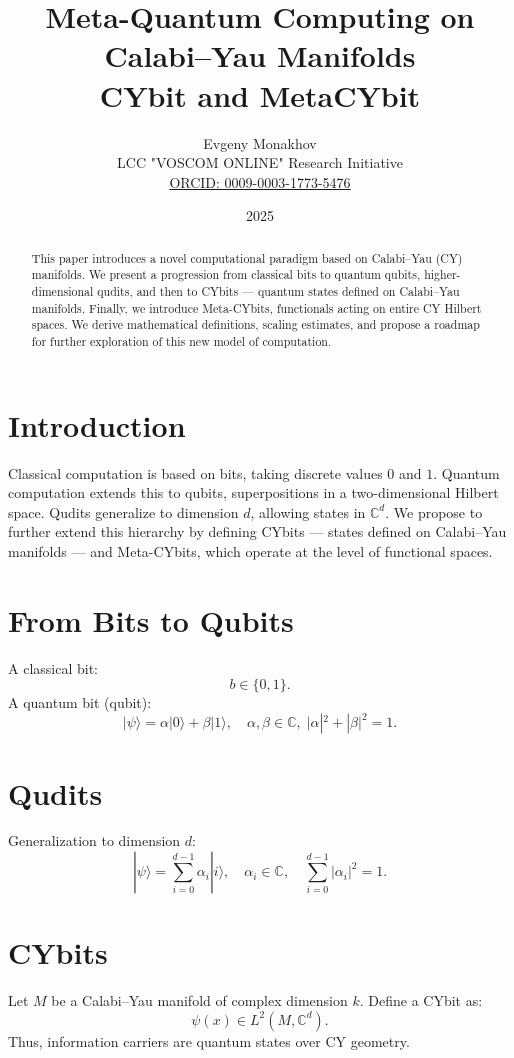 \documentclass[12pt,a4paper]{article}
\title{Meta-Quantum Computing on Calabi--Yau Manifolds \\ CYbit and MetaCYbit}
\author{Evgeny Monakhov \\ LCC "VOSCOM ONLINE" Research Initiative \\ 
\href{https://orcid.org/0009-0003-1773-5476}{ORCID: 0009-0003-1773-5476}}
\date{2025}
\begin{document}
\maketitle

\begin{abstract}
This paper introduces a novel computational paradigm based on Calabi--Yau (CY) manifolds.
We present a progression from classical bits to quantum qubits, higher-dimensional qudits,
and then to CYbits --- quantum states defined on Calabi--Yau manifolds. 
Finally, we introduce Meta-CYbits, functionals acting on entire CY Hilbert spaces. 
We derive mathematical definitions, scaling estimates, and propose a roadmap 
for further exploration of this new model of computation. 
\end{abstract}

\section{Introduction}
Classical computation is based on bits, taking discrete values $0$ and $1$. 
Quantum computation extends this to qubits, superpositions in a two-dimensional Hilbert space.
Qudits generalize to dimension $d$, allowing states in $\mathbb{C}^d$. 
We propose to further extend this hierarchy by defining CYbits --- 
states defined on Calabi--Yau manifolds --- and Meta-CYbits, 
which operate at the level of functional spaces. 

\section{From Bits to Qubits}
A classical bit:
\[
b \in \{0,1\}.
\]
A quantum bit (qubit):
\[
|\psi\rangle = \alpha |0\rangle + \beta |1\rangle, \quad \alpha,\beta \in \mathbb{C}, \; |\alpha|^2+|\beta|^2=1.
\]

\section{Qudits}
Generalization to dimension $d$:
\[
|\psi\rangle = \sum_{i=0}^{d-1} \alpha_i |i\rangle, \quad \alpha_i \in \mathbb{C}, \quad \sum_{i=0}^{d-1}|\alpha_i|^2=1.
\]

\section{CYbits}
Let $M$ be a Calabi--Yau manifold of complex dimension $k$.  
Define a CYbit as:
\[
\psi(x) \in L^2(M,\mathbb{C}^d).
\]
Thus, information carriers are quantum states over CY geometry.  
\end{document}
